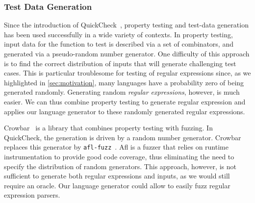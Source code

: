 \subsubsection*{Test Data Generation}

Since the introduction of QuickCheck~\cite{DBLP:conf/icfp/ClaessenH00},
property testing and test-data generation has been used successfully in a
wide variety of contexts.
In property testing, input data for the function
to test is described via a set of combinators, and generated via
a pseudo-random number generator. One difficulty of this approach is
to find the correct distribution of inputs that will generate challenging
test cases. This is particular troublesome for testing of regular expressions
since, as we highlighted in \cref{sec:motivation}, many languages
have a probability zero of being generated randomly.
Generating random \emph{regular expressions}, however, is much easier. We can
thus combine property testing to generate regular expression and applies
our language generator to these randomly generated regular expressions.

Crowbar~\cite{crowbar} is a library that combines property testing with fuzzing.
In QuickCheck, the generation is driven by a random number generator. Crowbar replaces this generator by \texttt{afl-fuzz}~\cite{afl}. Afl is a fuzzer that
relies on runtime instrumentation to provide
good code coverage, thus eliminating the need to specify the distribution of random generators.
This approach, however, is not sufficient to generate both regular expressions
and inputs, as we would still require an oracle. Our language generator
could allow to easily fuzz regular expression parsers.





